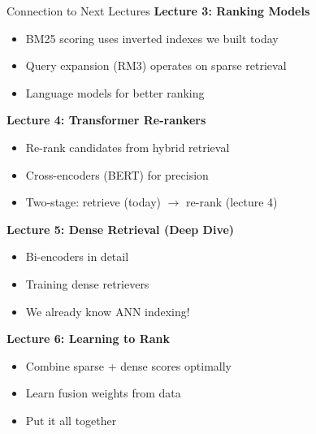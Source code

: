 \documentclass[aspectratio=169]{beamer}
\begin{document}
\begin{frame}[shrink=10]{Connection to Next Lectures}
\textbf{Lecture 3: Ranking Models}
\begin{itemize}
    \item BM25 scoring uses inverted indexes we built today
    \item Query expansion (RM3) operates on sparse retrieval
    \item Language models for better ranking
\end{itemize}

\vspace{0.5em}

\textbf{Lecture 4: Transformer Re-rankers}
\begin{itemize}
    \item Re-rank candidates from hybrid retrieval
    \item Cross-encoders (BERT) for precision
    \item Two-stage: retrieve (today) $\rightarrow$ re-rank (lecture 4)
\end{itemize}

\vspace{0.5em}

\textbf{Lecture 5: Dense Retrieval (Deep Dive)}
\begin{itemize}
    \item Bi-encoders in detail
    \item Training dense retrievers
    \item We already know ANN indexing!
\end{itemize}

\vspace{0.5em}

\textbf{Lecture 6: Learning to Rank}
\begin{itemize}
    \item Combine sparse + dense scores optimally
    \item Learn fusion weights from data
    \item Put it all together
\end{itemize}
\end{frame}
\end{document}
